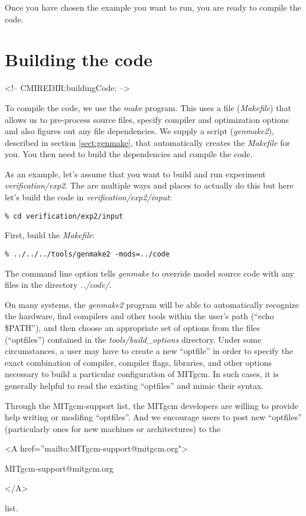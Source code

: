 Once you have chosen the example you want to run, you are ready to
compile the code.

\section[Building MITgcm]{Building the code}
\label{sect:buildingCode}
\begin{rawhtml}
<!-- CMIREDIR:buildingCode: -->
\end{rawhtml}

To compile the code, we use the {\em make} program. This uses a file
({\em Makefile}) that allows us to pre-process source files, specify
compiler and optimization options and also figures out any file
dependencies. We supply a script ({\em genmake2}), described in
section \ref{sect:genmake}, that automatically creates the {\em
  Makefile} for you. You then need to build the dependencies and
compile the code.

As an example, let's assume that you want to build and run experiment
\textit{verification/exp2}. The are multiple ways and places to
actually do this but here let's build the code in
\textit{verification/exp2/input}:
\begin{verbatim}
% cd verification/exp2/input
\end{verbatim}
First, build the {\em Makefile}:
\begin{verbatim}
% ../../../tools/genmake2 -mods=../code
\end{verbatim}
The command line option tells {\em genmake} to override model source
code with any files in the directory {\em ../code/}.

On many systems, the {\em genmake2} program will be able to
automatically recognize the hardware, find compilers and other tools
within the user's path (``echo \$PATH''), and then choose an
appropriate set of options from the files (``optfiles'') contained in
the {\em tools/build\_options} directory.  Under some circumstances, a
user may have to create a new ``optfile'' in order to specify the
exact combination of compiler, compiler flags, libraries, and other
options necessary to build a particular configuration of MITgcm.  In
such cases, it is generally helpful to read the existing ``optfiles''
and mimic their syntax.

Through the MITgcm-support list, the MITgcm developers are willing to
provide help writing or modifing ``optfiles''.  And we encourage users
to post new ``optfiles'' (particularly ones for new machines or
architectures) to the 
\begin{rawhtml} <A href=''mailto:MITgcm-support@mitgcm.org"> \end{rawhtml}
MITgcm-support@mitgcm.org
\begin{rawhtml} </A> \end{rawhtml}
list.

